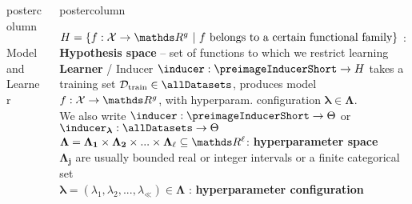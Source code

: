 \documentclass{beamer}
\newlength{\columnheight} %
\begin{document}
\begin{frame}[fragile]{}
\begin{columns}
\begin{column}{.31\textwidth}
\begin{beamercolorbox}[center]{postercolumn}
\begin{minipage}{.98\textwidth}
{\begin{myblock}{Model and Learner}
\end{myblock}\vfill
				}
			\end{minipage}
		\end{beamercolorbox}
	\end{column}
	\begin{column}{.31\textwidth}
		\begin{beamercolorbox}[center]{postercolumn}
			\begin{minipage}{.98\textwidth}
				\parbox[t][\columnheight]{\textwidth}{
\begin{myblock}{} \vspace{-4ex}
$\Hspace = \{f : \Xspace \rightarrow \R^g ~|~ f \text{ belongs to a certain functional family}\}$ : \\ \textbf{Hypothesis space} -- set of functions to which we restrict learning 	\\

\textbf{Learner} / Inducer $\inducer: \preimageInducerShort \rightarrow \Hspace$  takes a training set  $\Dtrain \in \allDatasets$, produces model $f : \Xspace \rightarrow \R^g$, with hyperparam. configuration $\bm{\lambda} \in \bm{\Lambda}$.\\
We also write $\inducer: \preimageInducerShort \rightarrow \Theta$ or $\inducer_{\bm{\lambda} }: \allDatasets \rightarrow \Theta$ \\

$\bm{\Lambda} = \bm{\Lambda_1} \times \bm{\Lambda_2} \times ... \times \bm{\Lambda_}{\ll} \subseteq \R^{\ll}$: %
\textbf{hyperparameter space} \\
$\bm{\Lambda_j} $ are usually bounded real or integer intervals or a finite categorical set\\

$\bm{\lambda} = (\lambda_1, \lambda_2, ..., \lambda_{\ll}) \in \bm{\Lambda}$ : \textbf{hyperparameter configuration} \\





\end{myblock}}
\end{minipage}
\end{beamercolorbox}
\end{column}
\end{columns}
\end{frame}
\end{document}
